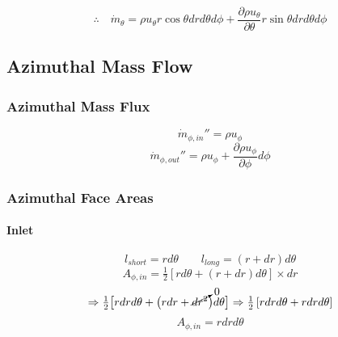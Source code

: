 \documentclass[12pt, letterpaper, twoside]{article}
\begin{document}
            \begin{equation}\label{eq:mdottheta}
                \therefore \quad \dot{m}_{\theta} = 
                \rho u_{\theta} r\cos\theta dr d\theta d\phi + 
                \frac{\partial\rho u_{\theta}}{\partial\theta} r\sin\theta dr d\theta d\phi
            \end{equation}
        
    \subsection{Azimuthal Mass Flow}
        \subsubsection{Azimuthal Mass Flux}
            \begin{equation}
                \dot{m}_{\phi,in}'' = \rho u_{\phi}
            \end{equation}
            \begin{equation}
                \dot{m}_{\phi,out}'' = \rho u_{\phi}  +
                \frac{\partial \rho u_{\phi}}{\partial \phi} d\phi
            \end{equation}

        \subsubsection{Azimuthal Face Areas}
        \paragraph{Inlet}
            \begin{equation*}
                l_{short} = r d\theta \qquad
                l_{long} = (r + dr) d\theta 
            \end{equation*}
            \begin{equation}\label{eq:Aphi_init}
                A_{\phi,in} = \tfrac{1}{2} \left[rd\theta + \left(r+dr\right)d\theta\right] \times dr
            \end{equation}
            \begin{equation*}
                \Rightarrow
                \tfrac{1}{2} \big[r dr d\theta +  \big(rdr + \cancelto{0}{dr^2}\big) d\theta \big] 
                \Rightarrow
                \tfrac{1}{2} \left[r dr d\theta + r dr d\theta\right]
            \end{equation*}
            \begin{equation}\label{eq:Athetain_final}
                A_{\phi,in} = r dr d\theta
            \end{equation}
\end{document}
